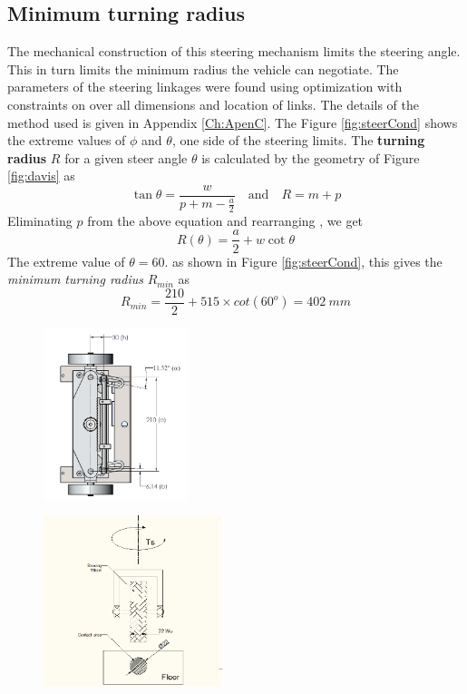 \subsection{Minimum turning radius}
The mechanical construction of this steering mechanism limits the steering angle. This in turn limits the minimum radius the vehicle can negotiate. The parameters of the steering linkages were found using  optimization with constraints on over all dimensions and location  of links. The details of the method used is given in Appendix \ref{Ch:ApenC}. The
Figure \ref{fig:steerCond} shows the extreme values of $\phi$ and $ \theta$, one side of the steering limits. The \textbf{ turning radius } $R$ for a given steer angle $\theta$  is calculated  by the geometry of Figure  \ref{fig:davis} as
\begin{equation*}
\tan\theta =\frac{w}{p+m-\frac{a}{2}} \quad \text{and} \quad R=m+p
\end{equation*}
Eliminating $p$  from the above equation and rearranging , we get 
\begin{equation}
\label{eqn:turningRadius}
R(\theta)=\frac{a}{2}+w\cot\theta
\end{equation}
The extreme value of $\theta=60.$ as shown in Figure \ref{fig:steerCond}, this gives the \textit{minimum turning radius } $R_{min}$ as
\begin{equation*}
R_{min}=\frac{210}{2}+515 \times cot(60^o)=402~mm
\end{equation*}

\begin{figure}
	\centering
	\begin{minipage}{.5\textwidth}
		\centering
		\includegraphics[width=\linewidth,height=5cm,keepaspectratio]{Chapter3/fig/davis}
		\label{fig:davis}
	\end{minipage}%
	\begin{minipage}{.5\textwidth}
		\centering
		\includegraphics[width=\linewidth,height=5cm,keepaspectratio]{Chapter3/fig/steerTorqCal}
		\label{fig:steerTorq}
	\end{minipage}	
\end{figure} 

